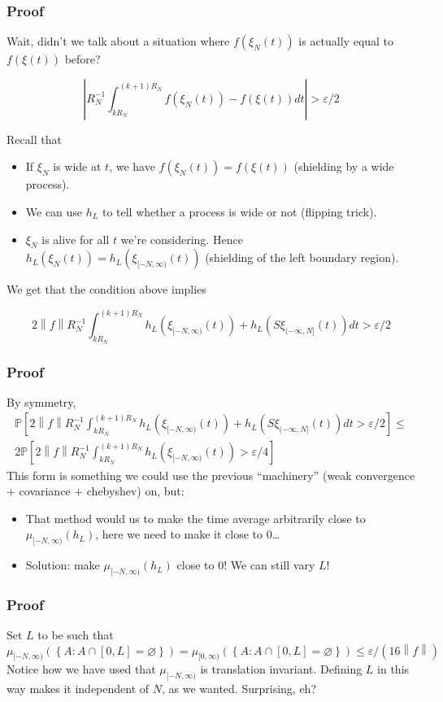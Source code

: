\documentclass{beamer}
\newcommand{\norm}[1]{{\left\lVert#1\right\rVert}}
\begin{document}
\begin{frame}
    \frametitle{Proof}
    Wait, didn't we talk about a situation where $f(\xi_N(t))$ is actually equal to $f(\xi(t))$ before?

    \[
        \left|R_N^{-1}\int_{kR_N}^{(k+1)R_N}f(\xi_N(t)) - f(\xi(t))dt \right| > \varepsilon/2 
    \]

    Recall that 
    \begin{itemize}
        \item If $\xi_N$ is wide at $t$, we have $f(\xi_N(t)) = f(\xi(t))$ (shielding by a wide process). 
        \item We can use $h_L$ to tell whether a process is wide or not (flipping trick).
        \item $\xi_N$ is alive for all $t$ we're considering. Hence $h_L(\xi_N(t)) = h_L(\xi_{[-N,\infty)}(t))$ (shielding of the left boundary region).
    \end{itemize}
    We get that the condition above implies

    \[
        2\norm{f}R_N^{-1}\int_{kR_N}^{(k+1)R_N}h_L(\xi_{[-N, \infty)}(t)) + h_L(S\xi_{(-\infty, N]}(t))dt > \varepsilon/2
    \]
\end{frame}


\begin{frame}
    \frametitle{Proof}
    By symmetry,
    \begin{gather*}
        \mathbb{P}\left[  2\norm{f}R_N^{-1}\int_{kR_N}^{(k+1)R_N}h_L(\xi_{[-N, \infty)}(t)) + h_L(S\xi_{(-\infty, N]}(t))dt > \varepsilon/2 \right] \leq \\
        2\mathbb{P}\left[ 2\norm{f}R_N^{-1}\int_{kR_N}^{(k+1)R_N}h_L(\xi_{[-N, \infty)}(t)) > \varepsilon/4 \right]
    \end{gather*}
    This form is something we could use the previous ``machinery'' (weak convergence + covariance + chebyshev) on, but:
    \begin{itemize}
        \item That method would us to make the time average arbitrarily close to $\mu_{[-N, \infty)}(h_L)$, here we need to make it close to 0\dots
        \item Solution: make $\mu_{[-N, \infty)}(h_L)$ close to 0! We can still vary $L$!
    \end{itemize}
\end{frame}

\begin{frame}
    \frametitle{Proof}
    Set $L$ to be such that 
    \[
        \mu_{[-N, \infty)}\left( \left\{ A : A \cap [0,L] = \varnothing \right\} \right) = 
        \mu_{[0, \infty)}\left( \left\{ A : A \cap [0,L] = \varnothing \right\} \right) \leq \varepsilon/(16\norm{f})
    \]
    Notice how we have used that $\mu_{[-N, \infty)}$ is translation invariant. Defining $L$ in this way makes it independent of $N$, as we wanted.
    Surprising, eh?
\end{frame}
\end{document}
